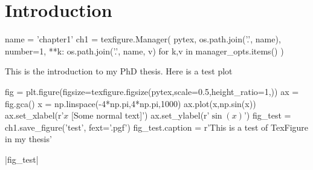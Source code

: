 \chapter{Introduction}\label{ch:introduction}

\begin{pycode}[chapter1]
name = 'chapter1'
ch1 = texfigure.Manager(
    pytex,
    os.path.join('.', name),
    number=1,
    **{k: os.path.join('.', name, v) for k,v in manager_opts.items()}
)
\end{pycode}

This is the introduction to my PhD thesis. Here is a test plot

\begin{pycode}[chapter1]
fig = plt.figure(figsize=texfigure.figsize(pytex,scale=0.5,height_ratio=1,))
ax = fig.gca()
x = np.linspace(-4*np.pi,4*np.pi,1000)
ax.plot(x,np.sin(x))
ax.set_xlabel(r'$x$ [Some normal text]')
ax.set_ylabel(r'$\sin{(x)}$')
fig_test = ch1.save_figure('test', fext='.pgf')
fig_test.caption = r'This is a test of TexFigure in my thesis'
\end{pycode}
\py[chapter1]|fig_test|
